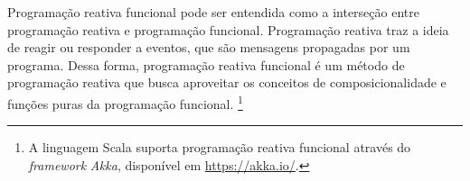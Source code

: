 Programação reativa funcional pode ser entendida 
como a interseção entre programação reativa e 
programação funcional. Programação reativa traz a 
ideia de reagir ou responder a eventos, que são 
mensagens propagadas por um programa. Dessa forma, 
programação reativa funcional é um método de 
programação reativa que busca aproveitar os 
conceitos de composicionalidade e funções puras 
da programação funcional.\cite{reactiveprog}
\footnote{A linguagem Scala suporta programação 
reativa funcional através do \textit{framework} 
\textit{Akka}, disponível em \url{https://akka.io/}.}